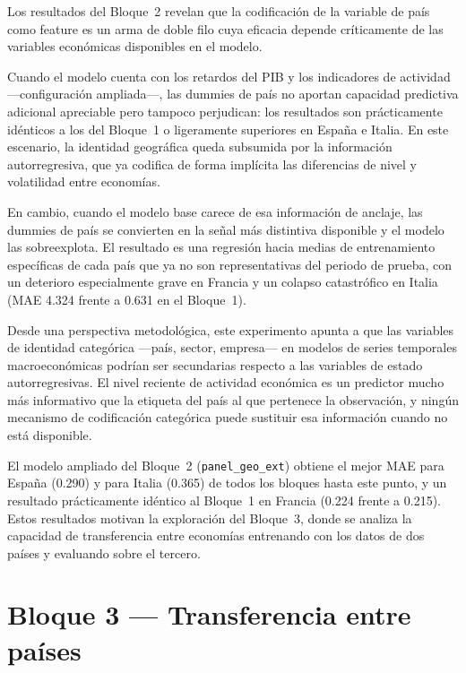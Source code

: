 Los resultados del Bloque~2 revelan que la codificación de la variable de país como feature
es un arma de doble filo cuya eficacia depende críticamente de las variables económicas
disponibles en el modelo.

Cuando el modelo cuenta con los retardos del PIB y los indicadores de actividad
---configuración ampliada---, las dummies de país no aportan capacidad predictiva adicional
apreciable pero tampoco perjudican: los resultados son prácticamente idénticos a los del
Bloque~1 o ligeramente superiores en España e Italia. En este escenario, la identidad
geográfica queda subsumida por la información autorregresiva, que ya codifica de forma
implícita las diferencias de nivel y volatilidad entre economías.

En cambio, cuando el modelo base carece de esa información de anclaje, las dummies de
país se convierten en la señal más distintiva disponible y el modelo las sobreexplota. El
resultado es una regresión hacia medias de entrenamiento específicas de cada país que ya no
son representativas del periodo de prueba, con un deterioro especialmente grave en Francia
y un colapso catastrófico en Italia (MAE 4.324 frente a 0.631 en el Bloque~1).

Desde una perspectiva metodológica, este experimento apunta a que las variables de
identidad categórica ---país, sector, empresa--- en modelos de series temporales
macroeconómicas podrían ser secundarias respecto a las variables de estado autorregresivas. El nivel
reciente de actividad económica es un predictor mucho más informativo que la etiqueta del
país al que pertenece la observación, y ningún mecanismo de codificación categórica puede
sustituir esa información cuando no está disponible.

El modelo ampliado del Bloque~2 (\texttt{panel\_geo\_ext}) obtiene el mejor MAE para
España (0.290) y para Italia (0.365) de todos los bloques hasta este punto, y un resultado
prácticamente idéntico al Bloque~1 en Francia (0.224 frente a 0.215). Estos resultados
motivan la exploración del Bloque~3, donde se analiza la capacidad de transferencia entre
economías entrenando con los datos de dos países y evaluando sobre el tercero.

\FloatBarrier
\section{Bloque 3 --- Transferencia entre países}

